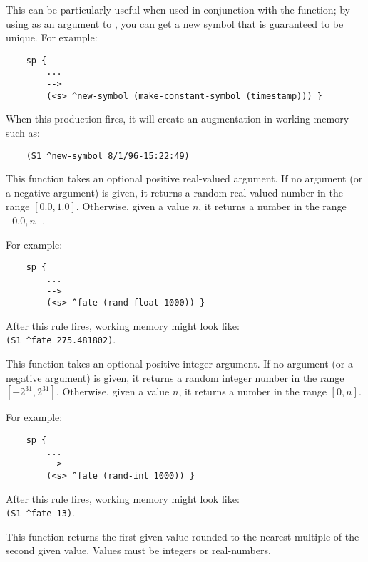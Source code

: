 \begin{description}
	This can be particularly useful when used in conjunction with the  function; by using  as an argument to , you can get a new symbol that is guaranteed to be unique. For example:

	\begin{verbatim}
	sp {
	    ...
	    -->
	    (<s> ^new-symbol (make-constant-symbol (timestamp))) }
	\end{verbatim}

	When this production fires, it will create an augmentation in working memory such as:

	\begin{verbatim}
	(S1 ^new-symbol 8/1/96-15:22:49)
	\end{verbatim}    


\item [\soarb{rand-float} --- ] 
	This function takes an optional positive real-valued argument. If no argument (or a negative argument) is given, it returns a random real-valued number in the range $[0.0,1.0]$. Otherwise, given a value $n$, it returns a number in the range $[0.0, n]$.

	For example:
	
	\begin{verbatim}
	sp {
	    ...
	    -->
	    (<s> ^fate (rand-float 1000)) }
	\end{verbatim}
	
	After this rule fires, working memory might look like: \\
	\verb|(S1 ^fate 275.481802)|.


\item [\soarb{rand-int} --- ] 
	This function takes an optional positive integer argument. If no argument (or a negative argument) is given, it returns a random integer number in the range $[-2^{31}, 2^{31}]$. Otherwise, given a value $n$, it returns a number in the range $[0, n]$.

	For example:
	
	\begin{verbatim}
	sp {
	    ...
	    -->
	    (<s> ^fate (rand-int 1000)) }
	\end{verbatim}
	
	After this rule fires, working memory might look like: \\
	\verb|(S1 ^fate 13)|.


\item [\soarb{round-off} --- ] 
	This function returns the first given value rounded to the nearest multiple of the second given value. Values must be integers or real-numbers.


\end{description}
